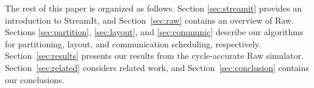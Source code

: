 The rest of this paper is organized as follows.  Section
\ref{sec:streamit} provides an introduction to StreamIt, and
Section~\ref{sec:raw} contains an overview of Raw.  Sections
\ref{sec:partition}, \ref{sec:layout}, and \ref{sec:communic} describe
our algorithms for partitioning, layout, and communication scheduling,
respectively.  Section~\ref{sec:results} presents our results from the
cycle-accurate Raw simulator.  Section~\ref{sec:related} considers
related work, and Section~\ref{sec:conclusion} contains our
conclusions.
